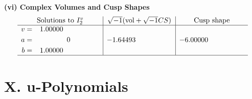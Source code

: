 \documentclass[1p]{elsarticle_modified}
\theoremstyle{definition}
\newcommand{\I}{\sqrt{-1}}
\begin{document}
\newpage\flushleft \textbf{(vi) Complex Volumes and Cusp Shapes}
$$\begin{array}{c|c|c}  
\text{Solutions to }I^v_{2}& \I (\text{vol} + \sqrt{-1}CS) & \text{Cusp shape}\\
 \hline 
\begin{aligned}
v &= \phantom{-}1.00000\phantom{ +0.000000I} \\
a &= \phantom{-0.000000 } 0 \\
b &= \phantom{-}1.00000\phantom{ +0.000000I}\end{aligned}
 & -1.64493\phantom{ +0.000000I} & -6.00000\phantom{ +0.000000I}\\
 \hline 
 \end{array}$$\newpage
\newpage\renewcommand{\arraystretch}{1}
\centering \section*{ X. u-Polynomials}
\end{document}
